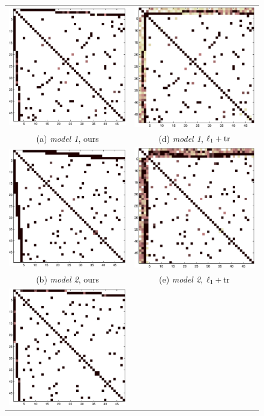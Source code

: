 \documentclass[letterpaper]{article}
\begin{document}
\begin{figure}
\label{fig:synth}
\center
\begin{tabular}{cc}
    \includegraphics[width=.3\linewidth]{fig/disjoint_om} 
  & \includegraphics[width=.3\linewidth]{fig/disjoint_tr} 
   \\    (a) \textit{model 1}, ours & (d)  \textit{model 1}, $\ell_1+{\rm tr}$ \\[6pt]
      \includegraphics[width=.3\linewidth]{fig/overlap_om}
  &   \includegraphics[width=.3\linewidth]{fig/overlap_tr}
   \\    (b)  \textit{model 2}, ours   & (e)  \textit{model 2}, $\ell_1+{\rm tr}$    \\[6pt]
      \includegraphics[width=.3\linewidth]{fig/diff_om}

\end{tabular}
\end{figure}
\end{document}
